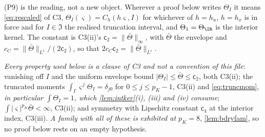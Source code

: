 \begin{remark}\label{rem:pkernel}
\textup{(P9)} is the reading, not a new object. Wherever a proof below writes $\Theta_{I}$ it
means \eqref{eq:rescaled} of C3, $\Theta_{I}(\varsigma)=C_h(h\varsigma,I)$ for whichever of $h=h_u$,
$h=h_x$ is in force and for $I\in\mathfrak I$ the realised truncation interval, and
$\Theta_1=\Theta_\IR$ is the interior kernel. The constant is C3(ii)'s
$\mathsf c_2=\|\bar\Theta\|_\infty$, with $\bar\Theta$ the envelope and
$c_C=\|\bar\Theta\|_{L^{1}}/(2\mathsf c_2)$, so that $2c_C\mathsf c_2=\|\bar\Theta\|_{L^{1}}$.

\emph{Every property used below is a clause of C3 and not a convention of this file}: vanishing off
$I$ and the uniform envelope bound $|\Theta_{I}|\le\bar\Theta\le\mathsf c_2$, both C3(ii); the
truncated moments $\int_{I}\varsigma^{\,j}\Theta_{I}=\delta_{j0}$ for
$0\le j\le p_K-1$, C3(ii) and \eqref{eq:truncmom}, \emph{in particular $\int\Theta_{I}=1$, which
\cref{lem:intker}(i), (iii) and (iv) consume}; $\int|\varsigma|^{p_K}\bar\Theta<\infty$, C3(ii); and
symmetry with Lipschitz constant $\mathsf c_4$ at the interior index, C3(iii). \emph{A family with all
of these is exhibited at $p_K=8$}, \cref{lem:bdryfam}, so no proof below rests on an empty hypothesis.
\end{remark}

